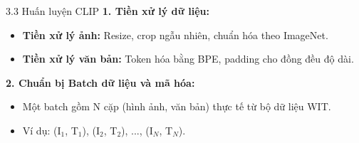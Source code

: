     
    

\begin{frame}{3.3 Huấn luyện CLIP}
    \textbf{1. Tiền xử lý dữ liệu:}
    \begin{itemize}
        \item \textbf{Tiền xử lý ảnh:} Resize, crop ngẫu nhiên, chuẩn hóa theo ImageNet.
        \item \textbf{Tiền xử lý văn bản:} Token hóa bằng BPE, padding cho đồng đều độ dài.
    \end{itemize}
    \bigskip
    
    \textbf{2. Chuẩn bị Batch dữ liệu và mã hóa:}
    \begin{itemize}
        \item Một batch gồm N cặp (hình ảnh, văn bản) thực tế từ bộ dữ liệu WIT.
        \item Ví dụ: (I$_1$, T$_1$), (I$_2$, T$_2$), ..., (I$_N$, T$_N$).
    \end{itemize}
\end{frame}

